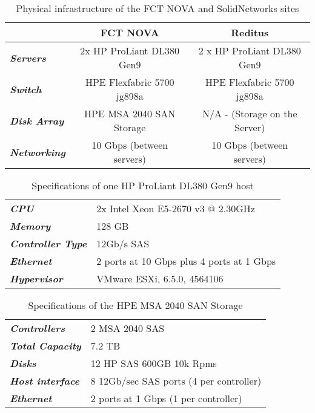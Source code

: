 \begin{table}[htpb]
\centering
\begin{tabular}{lcc}
\hline
                             & \textbf{FCT NOVA}          & \textbf{Reditus}              \\ \hline
\textit{\textbf{Servers}}    & 2x HP ProLiant DL380 Gen9 & 2 x HP ProLiant DL380 Gen9    \\
\textit{\textbf{Switch}}     & HPE Flexfabric 5700 jg898a & HPE Flexfabric 5700 jg898a    \\
\textit{\textbf{Disk Array}} & HPE MSA 2040 SAN Storage   & N/A - (Storage on the Server) \\
\textit{\textbf{Networking}} & 10 Gbps (between servers)  & 10 Gbps (between servers)     \\ \hline
\end{tabular}
\caption{Physical infrastructure of the FCT NOVA and SolidNetworks sites}
\end{table}

\begin{table}[htpb]
\centering
\begin{tabular}{ll}
\textit{\textbf{CPU}}             & 2x Intel Xeon E5-2670 v3 @ 2.30GHz        \\
\textit{\textbf{Memory}}          & 128 GB                                    \\
\textit{\textbf{Controller Type}} & 12Gb/s SAS                                \\
\textit{\textbf{Ethernet}}        & 2 ports at 10 Gbps plus 4 ports at 1 Gbps \\
\textit{\textbf{Hypervisor}}      & VMware ESXi, 6.5.0, 4564106              
\end{tabular}
\caption{Specifications of one HP ProLiant DL380 Gen9 host}
\end{table}

\begin{table}[htpb]
\centering
\begin{tabular}{ll}
\textit{\textbf{Controllers}}    & 2 MSA 2040 SAS                          \\
\textit{\textbf{Total Capacity}} & 7.2 TB                                  \\
\textit{\textbf{Disks}}          & 12 HP SAS 600GB 10k Rpms                \\
\textit{\textbf{Host interface}} & 8 12Gb/sec SAS ports (4 per controller) \\
\textit{\textbf{Ethernet}}       & 2 ports at 1 Gbps (1 per controller)   
\end{tabular}
\caption{Specifications of the HPE MSA 2040 SAN Storage}
\end{table}


